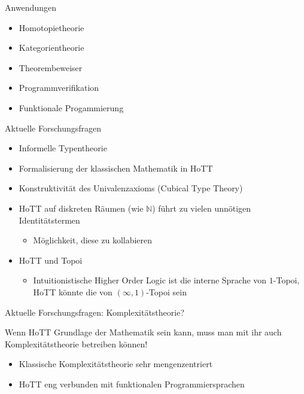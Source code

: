 \documentclass[11pt,aspectratio=169,notheorems]{beamer}
\begin{document}

\begin{frame}{Anwendungen} %
    \begin{itemize}
        \item Homotopietheorie
        \item Kategorientheorie
        \item Theorembeweiser
        \item Programmverifikation
        \item Funktionale Progammierung
    \end{itemize}
\end{frame}

\begin{frame}{Aktuelle Forschungsfragen}
    \begin{itemize}
        \item Informelle Typentheorie
        \item Formalisierung der klassischen Mathematik in HoTT
        \item Konstruktivität des Univalenzaxioms (Cubical Type Theory)
        \item HoTT auf diskreten Räumen (wie $\mathbb{N}$) führt zu vielen \glqq{}unnötigen\grqq{} Identitätstermen
        \begin{itemize}
            \item Möglichkeit, diese zu kollabieren
        \end{itemize} 
        \item HoTT und Topoi
        \begin{itemize}
            \item Intuitionistische Higher Order Logic ist die interne Sprache von $1$-Topoi, HoTT könnte die von $(\infty, 1)$-Topoi sein
        \end{itemize}
    \end{itemize}
\end{frame}

\begin{frame}[noframenumbering]{}
    \thispagestyle{empty}
    \begin{center}
        \scalebox{10}{\ucmark}
    \end{center}
\end{frame}

\begin{frame}{Aktuelle Forschungsfragen: Komplexitätstheorie?}
    \begin{simplebox}
        \Large
        \begin{center}
            Wenn HoTT Grundlage der Mathematik sein kann, muss man mit ihr auch Komplexitätstheorie betreiben können!
        \end{center}
    \end{simplebox}
    \begin{itemize}
        \item Klassische Komplexitätstheorie sehr \glqq{}mengenzentriert\grqq{}
        \item HoTT eng verbunden mit funktionalen Programmiersprachen
    \end{itemize}
\end{frame}
\end{document}
